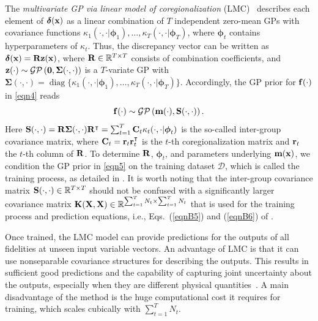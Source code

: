 \documentclass[journal ]{new-aiaa}
\DeclareMathOperator{\diag}{diag}
\begin{document}
	The \textit{multivariate GP via linear model of coregionalization} (LMC)~\citep[see e.g.,][]{Chiles1999,Fricker2013} describes each element of ${\boldsymbol \delta}({\bf x})$ as a linear combination of $T$ independent zero-mean GPs with covariance functions $\kappa_1(\cdot,\cdot|{\boldsymbol \phi}_1),\dots,\kappa_T(\cdot,\cdot|{\boldsymbol \phi}_T)$, where ${\boldsymbol \phi}_t$ contains hyperparameters of $\kappa_t$.
	Thus, the discrepancy vector can be written as ${\boldsymbol \delta}({\bf x}) = {\bf R} {\bf z}({\bf x})$, where ${\bf R} \in \mathbb{R}^{T \times T}$ consists of combination coefficients, and ${\bf z}(\cdot) \sim \mathcal{GP}\left({\bf 0},{\boldsymbol \Sigma}(\cdot,\cdot)\right)$ is a $T$-variate GP with ${\boldsymbol \Sigma}(\cdot,\cdot) = \diag\{\kappa_1(\cdot,\cdot|{\boldsymbol \phi}_1),\dots,\kappa_T(\cdot,\cdot|{\boldsymbol \phi}_T)\}$.
	Accordingly, the GP prior for ${\bf f}(\cdot)$ in \cref{eqn4} reads
	\begin{equation}\label{eqn5}
		{\bf f}(\cdot) \sim \mathcal{GP}\left({\bf m}(\cdot),{\bf S}(\cdot,\cdot)\right).
	\end{equation}
	Here 
	${\bf S}(\cdot,\cdot) = {\bf R} {\boldsymbol \Sigma}(\cdot,\cdot) {\bf R}^\intercal = \sum_{t=1}^T {\bf C}_t \kappa_t(\cdot,\cdot|{\boldsymbol \phi}_t)$ is the so-called inter-group covariance matrix, where ${\bf C}_t = {\bf r}_t {\bf r}_t^\intercal$ is the $t$-th coregionalization matrix and ${\bf r}_t$ the $t$-th column of ${\bf R}$.
	To determine ${\bf R}$, ${\boldsymbol \phi}_t$, and parameters underlying ${\bf m}({\bf x})$, we condition the GP prior in \cref{eqn5} on the training dataset $\mathcal{D}$, which is called the training process, as detailed in . 
	It is worth noting that the inter-group covariance matrix ${\bf S}(\cdot,\cdot) \in \mathbb{R}^{T \times T}$ should not be confused with a significantly larger covariance matrix ${\bf K}({\bf X},{\bf X}) \in \mathbb{R}^{\sum_{t=1}^{T}N_t \times \sum_{t=1}^{T}N_t}$ that is used for the training process and prediction equations, i.e., Eqs.~(\ref{eqnB5}) and (\ref{eqnB6}) of .
	
	Once trained, the LMC model can provide predictions for the outputs of all fidelities at unseen input variable vectors.
	An advantage of LMC is that it can use nonseparable covariance structures for describing the outputs.
	This results in sufficient good predictions and the capability of capturing joint uncertainty about the outputs, especially when they are different physical quantities~\citep{Fricker2013}.
	A main disadvantage of the method is the huge computational cost it requires for training, which scales cubically with $\sum_{t=1}^{T}N_t$.
	
\end{document}
